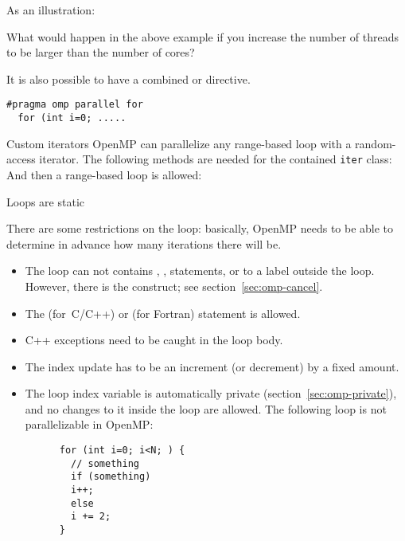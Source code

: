 As an illustration:
\begingroup \def\snippetcodefraction{.52} \def\snippetlistfraction{.48} %
\endgroup %

\begin{exercise}
  What would happen in the above example if you increase the number of threads
  to be larger than the number of cores?
\end{exercise}

It is also possible to have a combined
 or  directive.
\begin{lstlisting}
#pragma omp parallel for
  for (int i=0; .....
\end{lstlisting}

\begin{cppnote}{Custom iterators}
  OpenMP can parallelize any range-based loop with a random-access iterator.
  The following methods are needed for the contained \lstinline{iter} class:
  And then a range-based loop is allowed:
\end{cppnote}

 {Loops are static}

There are some restrictions on the loop: basically, OpenMP needs to be
able to determine in advance how many iterations there will be.
\begin{itemize}
\item The loop can not contains , ,  statements, or
   to a label outside the loop.
  However, there is the  construct;
  see section~\ref{sec:omp-cancel}.
\item The  (for~C/C++)
  or  (for Fortran)
  statement is allowed.
\item C++ exceptions need to be caught in the loop body.
\item The index update has to be an increment (or decrement) by a fixed amount.
\item The loop index variable is automatically private (section~\ref{sec:omp-private}),
  and no changes to it
  inside the loop are allowed.
  The following loop is not parallelizable in OpenMP:
    \begin{lstlisting}
      for (int i=0; i<N; ) {
        // something
        if (something)
        i++;
        else
        i += 2;
      }
    \end{lstlisting}
\end{itemize}

